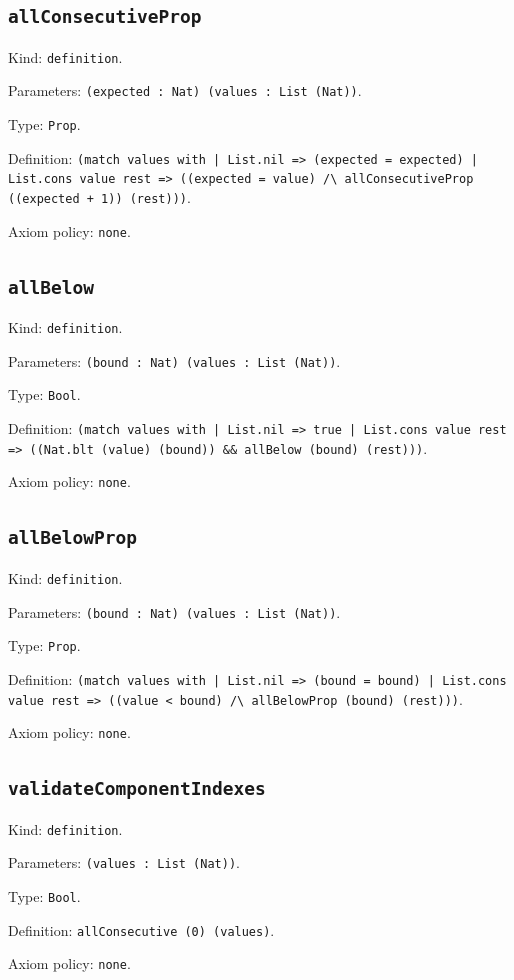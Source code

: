 \documentclass[11pt]{article}
\begin{document}
\subsection*{\texttt{allConsecutiveProp}}
\noindent Kind: \texttt{definition}.\par
\noindent Parameters: \texttt{(expected : Nat) (values : List (Nat))}.\par
\noindent Type: \texttt{Prop}.\par
\noindent Definition: \texttt{(match values with | List.nil => (expected = expected) | List.cons value rest => ((expected = value) /\textbackslash{} allConsecutiveProp ((expected + 1)) (rest)))}.\par
\noindent Axiom policy: \texttt{none}.\par
\subsection*{\texttt{allBelow}}
\noindent Kind: \texttt{definition}.\par
\noindent Parameters: \texttt{(bound : Nat) (values : List (Nat))}.\par
\noindent Type: \texttt{Bool}.\par
\noindent Definition: \texttt{(match values with | List.nil => true | List.cons value rest => ((Nat.blt (value) (bound)) \&\& allBelow (bound) (rest)))}.\par
\noindent Axiom policy: \texttt{none}.\par
\subsection*{\texttt{allBelowProp}}
\noindent Kind: \texttt{definition}.\par
\noindent Parameters: \texttt{(bound : Nat) (values : List (Nat))}.\par
\noindent Type: \texttt{Prop}.\par
\noindent Definition: \texttt{(match values with | List.nil => (bound = bound) | List.cons value rest => ((value < bound) /\textbackslash{} allBelowProp (bound) (rest)))}.\par
\noindent Axiom policy: \texttt{none}.\par
\subsection*{\texttt{validateComponentIndexes}}
\noindent Kind: \texttt{definition}.\par
\noindent Parameters: \texttt{(values : List (Nat))}.\par
\noindent Type: \texttt{Bool}.\par
\noindent Definition: \texttt{allConsecutive (0) (values)}.\par
\noindent Axiom policy: \texttt{none}.\par
\end{document}
